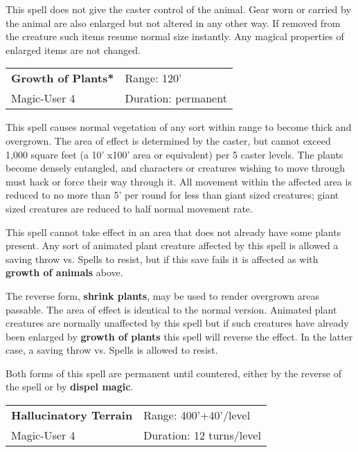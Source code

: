 \documentclass[a4paper,twoside,openany,10pt]{book}
\begin{document}
\begin{multicols}{2}
This spell does not give the caster control of the animal. Gear worn or carried by the animal are also enlarged but not altered in any other way. If removed from the creature such items resume normal size instantly. Any magical properties of enlarged items are not changed.

\smallskip\begin{flushleft} 
	\begin{tabularx}{0.45\textwidth}{@{}m{3.5cm}m{5.5cm}@{}} 
		\textbf{Growth of Plants*} & Range: 120'\\
Magic-User 4 &Duration: permanent\\
	\end{tabularx}\end{flushleft}

This spell causes normal vegetation of any sort within range to become thick and overgrown. The area of effect is determined by the caster, but cannot exceed 1,000 square feet (a 10' x100' area or equivalent) per 5 caster levels. The plants become densely entangled, and characters or creatures wishing to move through must hack or force their way through it. All movement within the affected area is reduced to no more than 5' per round for less than giant sized creatures; giant sized creatures are reduced to half normal movement rate.

This spell cannot take effect in an area that does not already have some plants present. Any sort of animated plant creature affected by this spell is allowed a saving throw vs. Spells to resist, but if this save fails it is affected as with \textbf{growth of animals} above.

The reverse form, \textbf{shrink plants}, may be used to render overgrown areas passable. The area of effect is identical to the normal version. Animated plant creatures are normally unaffected by this spell but if such creatures have already been enlarged by \textbf{growth of plants} this spell will reverse the effect. In the latter case, a saving throw vs. Spells is allowed to resist.

Both forms of this spell are permanent until countered, either by the reverse of the spell or by \textbf{dispel magic}.


\smallskip\begin{flushleft} 
	\begin{tabularx}{0.45\textwidth}{@{}m{3.5cm}m{5.5cm}@{}} 
		\textbf{Hallucinatory Terrain} &  Range: 400'+40'/level\\
Magic-User 4  & Duration: 12 turns/level\\
	\end{tabularx}\end{flushleft}


\end{multicols}
\end{document}
